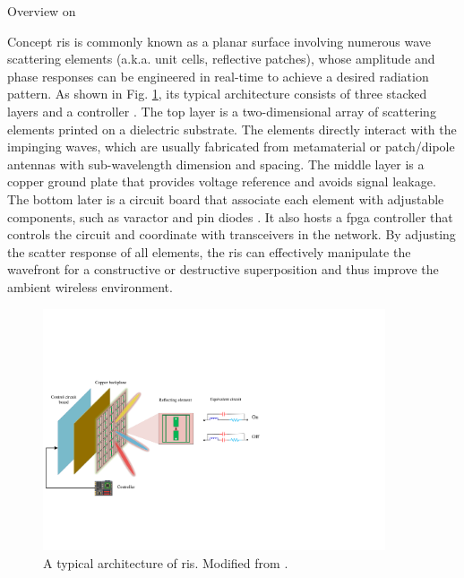 \begin{section}{Overview on }
	\begin{subsection}{Concept}
		\gls{ris} is commonly known as a planar surface involving numerous wave scattering elements (a.k.a. unit cells, reflective patches), whose amplitude and phase responses can be engineered in real-time to achieve a desired radiation pattern.
		As shown in Fig. \ref{fg:ris_architecture}, its typical architecture consists of three stacked layers and a controller \cite{Wu2020}.
		The top layer is a two-dimensional array of scattering elements printed on a dielectric substrate.
		The elements directly interact with the impinging waves, which are usually fabricated from metamaterial or patch/dipole antennas with sub-wavelength dimension and spacing.
		The middle layer is a copper ground plate that provides voltage reference and avoids signal leakage.
		The bottom later is a circuit board that associate each element with adjustable components, such as varactor and \gls{pin} diodes \cite{Dai2020}.
		It also hosts a \gls{fpga} controller that controls the circuit and coordinate with transceivers in the network.
		By adjusting the scatter response of all elements, the \gls{ris} can effectively manipulate the wavefront for a constructive or destructive superposition and thus improve the ambient wireless environment.
		\begin{figure}
			\centering
			\includegraphics[width=0.9\textwidth]{ris_architecture.pdf}
			\caption{A typical architecture of \gls{ris}. Modified from \cite{Wu2020}.}
			\label{fg:ris_architecture}
		\end{figure}
	\end{subsection}


\end{section}
